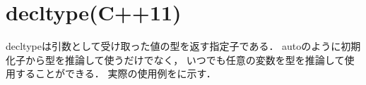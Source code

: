 \section{decltype(C++11)}
decltypeは引数として受け取った値の型を返す指定子である．
autoのように初期化子から型を推論して使うだけでなく，
いつでも任意の変数を型を推論して使用することができる．
実際の使用例をに示す．


\subsection{}




